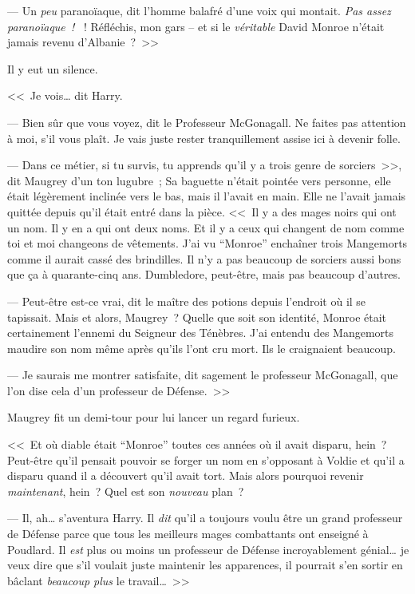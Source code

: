 --- Un \emph{peu} paranoïaque, dit l'homme balafré d'une voix qui montait. \emph{Pas assez paranoïaque~! }~! Réfléchis, mon gars -- et si le \emph{véritable} David Monroe n'était jamais revenu d'Albanie~?~>>

Il y eut un silence.

<<~Je vois… dit Harry.

--- Bien sûr que vous voyez, dit le Professeur McGonagall. Ne faites pas attention à moi, s'il vous plaît. Je vais juste rester tranquillement assise ici à devenir folle.

--- Dans ce métier, si tu survis, tu apprends qu'il y a trois genre de sorciers~>>, dit Maugrey d'un ton lugubre~; Sa baguette n'était pointée vers personne, elle était légèrement inclinée vers le bas, mais il l'avait en main. Elle ne l'avait jamais quittée depuis qu'il était entré dans la pièce. <<~Il y a des mages noirs qui ont un nom. Il y en a qui ont deux noms. Et il y a ceux qui changent de nom comme toi et moi changeons de vêtements. J'ai vu “Monroe” enchaîner trois Mangemorts comme il aurait cassé des brindilles. Il n'y a pas beaucoup de sorciers aussi bons que ça à quarante-cinq ans. Dumbledore, peut-être, mais pas beaucoup d'autres.

--- Peut-être est-ce vrai, dit le maître des potions depuis l'endroit où il se tapissait. Mais et alors, Maugrey~? Quelle que soit son identité, Monroe était certainement l'ennemi du Seigneur des Ténèbres. J'ai entendu des Mangemorts maudire son nom même après qu'ils l'ont cru mort. Ils le craignaient beaucoup.

--- Je saurais me montrer satisfaite, dit sagement le professeur McGonagall, que l'on dise cela d'un professeur de Défense.~>>

Maugrey fit un demi-tour pour lui lancer un regard furieux.

<<~Et où diable était “Monroe” toutes ces années où il avait disparu, hein~? Peut-être qu'il pensait pouvoir se forger un nom en s'opposant à Voldie et qu'il a disparu quand il a découvert qu'il avait tort. Mais alors pourquoi revenir \emph{maintenant}, hein~? Quel est son \emph{nouveau} plan~?

--- Il, ah… s'aventura Harry. Il \emph{dit} qu'il a toujours voulu être un grand professeur de Défense parce que tous les meilleurs mages combattants ont enseigné à Poudlard. Il \emph{est} plus ou moins un professeur de Défense incroyablement génial… je veux dire que s'il voulait juste maintenir les apparences, il pourrait s'en sortir en bâclant \emph{beaucoup plus} le travail…~>>


